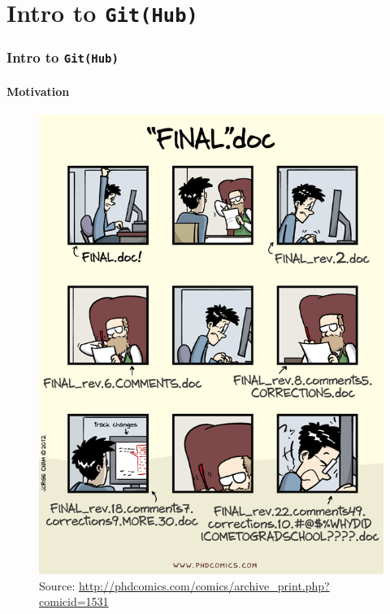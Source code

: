 \documentclass[
  shownotes,
  xcolor={svgnames},
  hyperref={colorlinks,citecolor=DarkBlue,linkcolor=DarkRed,urlcolor=DarkBlue}
  ]{beamer}
\begin{document}
\section{ Intro to \texttt{Git(Hub)}}
\begin{frame}
\frametitle{ Intro to \texttt{Git(Hub)}}
\framesubtitle{Motivation}

\begin{figure}[H] \centering
  \centering
  \includegraphics[scale=0.25]{figures/phd101212s}
  \\
  \tiny
  Source: \url{http://phdcomics.com/comics/archive_print.php?comicid=1531}
\end{figure}



\end{frame}
\end{document}
